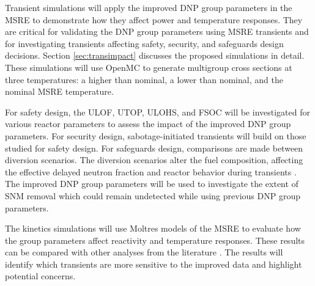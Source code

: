 Transient simulations will apply the improved \gls{DNP} group parameters in the \gls{MSRE} to demonstrate how they affect power and temperature responses.
They are critical for validating the \gls{DNP} group parameters using \gls{MSRE} transients and for investigating transients affecting safety, security, and safeguards design decisions.
Section \ref{sec:transimpact} discusses the proposed simulations in detail.
These simulations will use OpenMC to generate multigroup cross sections at three temperatures: a higher than nominal, a lower than nominal, and the nominal \gls{MSRE} temperature.

For safety design, the \gls{ULOF}, \gls{UTOP}, \gls{ULOHS}, and \gls{FSOC} will be investigated for various reactor parameters to assess the impact of the improved \gls{DNP} group parameters.
For security design, sabotage-initiated transients will build on those studied for safety design.
For safeguards design, comparisons are made between diversion scenarios.
The diversion scenarios alter the fuel composition, affecting the effective delayed neutron fraction and reactor behavior during transients \cite{wheeler2021signatures}.
The improved \gls{DNP} group parameters will be used to investigate the extent of \gls{SNM} removal which could remain undetected while using previous \gls{DNP} group parameters.

The kinetics simulations will use Moltres models of the \gls{MSRE} to evaluate how the group parameters affect reactivity and temperature responses.
These results can be compared with other analyses from the literature \cite{ho2023exploring, singh2018nonlinear}.
The results will identify which transients are more sensitive to the improved data and highlight potential concerns.
